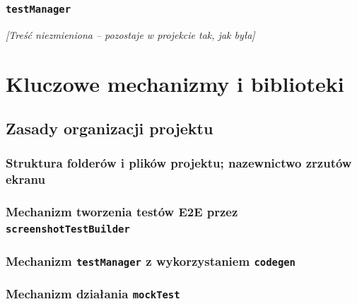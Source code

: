 \documentclass[12pt]{report}
\begin{document}
\subsection{\texttt{testManager}}
\label{sec:testManager}
\textit{[Treść niezmieniona – pozostaje w projekcie tak, jak była]}

\chapter{Kluczowe mechanizmy i biblioteki}

\section{Zasady organizacji projektu}

\subsection{Struktura folderów i plików projektu; nazewnictwo zrzutów ekranu}

\subsection{Mechanizm tworzenia testów E2E przez \texttt{screenshotTestBuilder}}

\subsection{Mechanizm \texttt{testManager} z wykorzystaniem \texttt{codegen}}

\subsection{Mechanizm działania \texttt{mockTest}}
\end{document}
